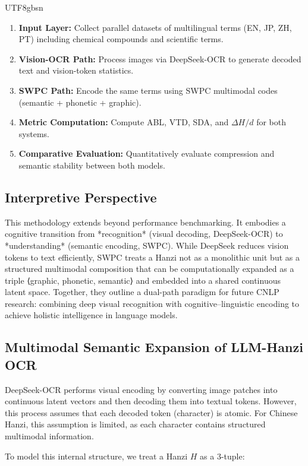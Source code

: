 \documentclass[conference]{IEEEtran}
\begin{document}
\begin{CJK*}{UTF8}{gbsn}
\begin{enumerate}
    \item \textbf{Input Layer:} Collect parallel datasets of multilingual terms (EN, JP, ZH, PT) including chemical compounds and scientific terms.  
    \item \textbf{Vision-OCR Path:} Process images via DeepSeek-OCR to generate decoded text and vision-token statistics.  
    \item \textbf{SWPC Path:} Encode the same terms using SWPC multimodal codes (semantic + phonetic + graphic).  
    \item \textbf{Metric Computation:} Compute ABL, VTD, SDA, and $\Delta H/d$ for both systems.  
    \item \textbf{Comparative Evaluation:} Quantitatively evaluate compression and semantic stability between both models.
\end{enumerate}

\subsection{Interpretive Perspective}

This methodology extends beyond performance benchmarking.  
It embodies a cognitive transition from *recognition* (visual decoding, DeepSeek-OCR) to *understanding* (semantic encoding, SWPC).  
While DeepSeek reduces vision tokens to text efficiently, SWPC treats a Hanzi not as a monolithic unit but as a structured multimodal composition that can be computationally expanded as a triple ⟨graphic, phonetic, semantic⟩ and embedded into a shared continuous latent space.  
Together, they outline a dual-path paradigm for future CNLP research: combining deep visual recognition with cognitive–linguistic encoding to achieve holistic intelligence in language models.

\subsection{Multimodal Semantic Expansion of LLM-Hanzi OCR}
\label{sec:hanzi_expansion}

DeepSeek-OCR performs visual encoding by converting image patches into continuous latent vectors and then decoding them into textual tokens. However, this process assumes that each decoded token (character) is atomic. For Chinese Hanzi, this assumption is limited, as each character contains structured multimodal information.

To model this internal structure, we treat a Hanzi $H$ as a 3-tuple:


\end{CJK*}
\end{document}
